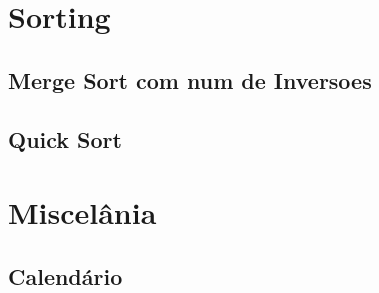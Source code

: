 \section{Sorting}
\subsection{Merge Sort com num de Inversoes}
\raggedbottom
\hrulefill
\subsection{Quick Sort}
\raggedbottom
\hrulefill

\section{Miscelânia}
\subsection{Calendário}
\raggedbottom
\hrulefill

